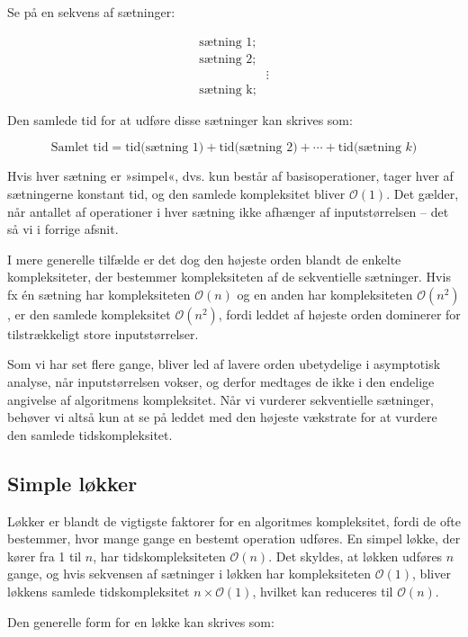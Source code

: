 Se på en sekvens af sætninger:

\begin{align*}
    \text{sætning 1;} \\
    \text{sætning 2;} \\
    & \vdots \\
    \text{sætning k;}
\end{align*}

Den samlede tid for at udføre disse sætninger kan skrives som:

\[
\text{Samlet tid} = \text{tid(sætning 1)} + \text{tid(sætning 2)} + \cdots + \text{tid(sætning } k) 
\]

Hvis hver sætning er »simpel«, dvs. kun består af basisoperationer, tager hver af sætningerne konstant tid, og den samlede kompleksitet bliver $\mathcal{O}(1)$. Det gælder, når antallet af operationer i hver sætning ikke afhænger af inputstørrelsen -- det så vi i forrige afsnit.

I mere generelle tilfælde er det dog den højeste orden blandt de enkelte kompleksiteter, der bestemmer kompleksiteten af de sekventielle sætninger. Hvis fx én sætning har kompleksiteten $\mathcal{O}(n)$ og en anden har kompleksiteten $\mathcal{O}(n^2)$, er den samlede kompleksitet $\mathcal{O}(n^2)$, fordi leddet af højeste orden dominerer for tilstrækkeligt store inputstørrelser.

Som vi har set flere gange, bliver led af lavere orden ubetydelige i asymptotisk analyse, når inputstørrelsen vokser, og derfor medtages de ikke i den endelige angivelse af algoritmens kompleksitet. Når vi vurderer sekventielle sætninger, behøver vi altså kun at se på leddet med den højeste vækstrate for at vurdere den samlede tidskompleksitet.

\subsection*{Simple løkker}

Løkker er blandt de vigtigste faktorer for en algoritmes kompleksitet, fordi de ofte bestemmer, hvor mange gange en bestemt operation udføres. En simpel løkke, der kører fra 1 til $n$, har tidskompleksiteten $\mathcal{O}(n)$. Det skyldes, at løkken udføres $n$ gange, og hvis sekvensen af sætninger i løkken har kompleksiteten $\mathcal{O}(1)$, bliver løkkens samlede tidskompleksitet $n \times \mathcal{O}(1)$, hvilket kan reduceres til $\mathcal{O}(n)$. 

Den generelle form for en løkke kan skrives som:

